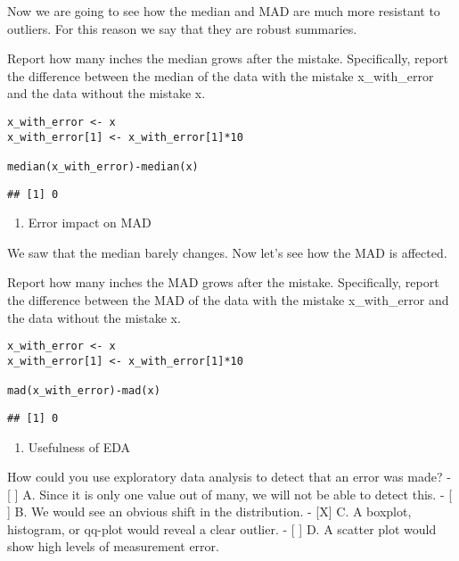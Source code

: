 \documentclass[]{article}
\providecommand{\tightlist}{%
  \setlength{\itemsep}{0pt}\setlength{\parskip}{0pt}}
\begin{document}
Now we are going to see how the median and MAD are much more resistant
to outliers. For this reason we say that they are robust summaries.

Report how many inches the median grows after the mistake. Specifically,
report the difference between the median of the data with the mistake
x\_with\_error and the data without the mistake x.

\begin{verbatim}
x_with_error <- x
x_with_error[1] <- x_with_error[1]*10

median(x_with_error)-median(x)
\end{verbatim}

\begin{verbatim}
## [1] 0
\end{verbatim}

\begin{enumerate}
\def\labelenumi{\arabic{enumi}.}
\setcounter{enumi}{5}
\tightlist
\item
  Error impact on MAD
\end{enumerate}

We saw that the median barely changes. Now let's see how the MAD is
affected.

Report how many inches the MAD grows after the mistake. Specifically,
report the difference between the MAD of the data with the mistake
x\_with\_error and the data without the mistake x.

\begin{verbatim}
x_with_error <- x
x_with_error[1] <- x_with_error[1]*10

mad(x_with_error)-mad(x)
\end{verbatim}

\begin{verbatim}
## [1] 0
\end{verbatim}

\begin{enumerate}
\def\labelenumi{\arabic{enumi}.}
\setcounter{enumi}{6}
\tightlist
\item
  Usefulness of EDA
\end{enumerate}

How could you use exploratory data analysis to detect that an error was
made? - {[} {]} A. Since it is only one value out of many, we will not
be able to detect this. - {[} {]} B. We would see an obvious shift in
the distribution. - {[}X{]} C. A boxplot, histogram, or qq-plot would
reveal a clear outlier. - {[} {]} D. A scatter plot would show high
levels of measurement error.
\end{document}
